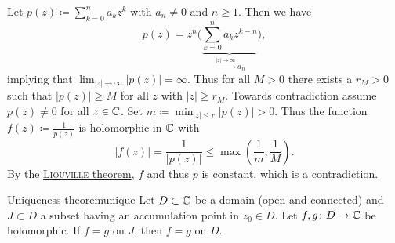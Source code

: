 \documentclass[a4paper,english]{article}
\begin{document}
\begin{pr}
    Let $p(z) \coloneqq \sum_{k = 0}^{n} a_k z^k$ with $a_n \ne 0$ and $n \ge 1$.
    Then we have
    \begin{equation*}
        p(z)
        = z^n \bigg( \underbrace{\sum_{k = 0}^{n} a_k z^{k - n}}_{\xrightarrow{| z | \to \infty} a_n}\bigg),
    \end{equation*}
    implying that $\lim_{| z | \to \infty} | p(z) | = \infty$.
    Thus for all $M > 0$ there exists a $r_M > 0$ such that $| p(z) | \ge M$ for all $z$ with $| z | \ge r_M$.
    Towards contradiction assume $p(z) \ne 0$ for all $z \in \operatorname{\mathbb{C}}$.
    Set $m \coloneqq \min_{| z | \le r} | p(z) | > 0$.
    Thus the function $f(z) \coloneqq \frac{1}{p(z)}$ is holomorphic in $\operatorname{\mathbb{C}}$ with
    \begin{equation*}
        | f(z) |
        = \frac{1}{| p(z) |}
        \le \max\left(\frac{1}{m}, \frac{1}{M}\right).
    \end{equation*}
    By the \hyperref[th:Liouville]{\textsc{Liouville} theorem}, $f$ and thus $p$ is constant, which is a contradiction.
\end{pr}

\begin{thm}{Uniqueness theorem}{unique}
    Let $D \subset \operatorname{\mathbb{C}}$ be a domain (open and connected) and $J \subset D$ a subset having an accumulation point in $z_0 \in D$.
    Let $f,g \colon D \to \operatorname{\mathbb{C}}$ be holomorphic.
    If $f = g$ on $J$, then $f = g$ on $D$.
\end{thm}
\end{document}
